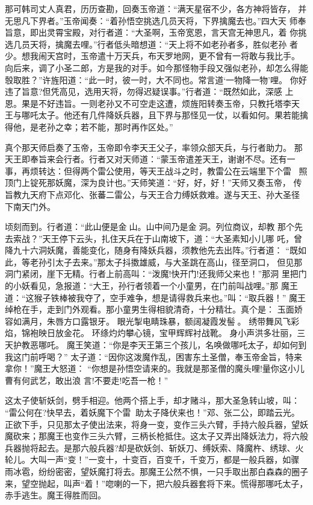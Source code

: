 那可韩司丈人真君，历历查勘，回奏玉帝道：“满天星宿不少，各方神将皆存，
并无思凡下界者。”玉帝闻奏：“着孙悟空挑选几员天将，下界擒魔去也。”四大天
师奉旨意，即出灵霄宝殿，对行者道：“大圣啊，玉帝宽恩，言天宫无神思凡，着
你挑选几员天将，擒魔去哩。”行者低头暗想道：“天上将不如老孙者多，胜似老孙
者少。想我闹天宫时，玉帝遣十万天兵，布天罗地网，更不曾有一将敢与我比手。
向后来，调了小圣二郎，方是我的对手。如今那怪物手段又强似老孙，却怎么得能
彀取胜？”许旌阳道：“此一时，彼一时，大不同也。常言道‘一物降一物’哩。
你好违了旨意?但凭高见，选用天将，勿得迟疑误事。”行者道：“既然如此，深感
上恩。果是不好违旨。一则老孙又不可空走这遭，烦旌阳转奏玉帝，只教托塔李天
王与哪吒太子。他还有几件降妖兵器，且下界与那怪见一仗，以看如何。果若能擒
得他，是老孙之幸；若不能，那时再作区处。”

真个那天师启奏了玉帝，玉帝即令李天王父子，率领众部天兵，与行者助力。
那天王即奉旨来会行者。行者又对天师道：“蒙玉帝遣差天王，谢谢不尽。还有一
事，再烦转达：但得两个雷公使用，等天王战斗之时，教雷公在云端里下个雷，
照顶门上锭死那妖魔，深为良计也。”天师笑道：“好，好，好！”天师又奏玉帝，
传旨教九天府下点邓化、张蕃二雷公，与天王合力缚妖救难。遂与天王、孙大圣径
下南天门外。

顷刻而到。行者道：“此山便是金山。山中间乃是金洞。列位商议，却教
那个先去索战？”天王停下云头，扎住天兵在于山南坡下，道：“大圣素知小儿哪
吒，曾降九十六洞妖魔，善能变化，随身有降妖兵器，须教他先去出阵。”行者道：
“既如此，等老孙引太子去来。”那太子抖擞雄威，与大圣跳在高山，径至洞口，
但见那洞门紧闭，崖下无精。行者上前高叫：“泼魔!快开门!还我师父来也！”那洞
里把门的小妖看见，急报道：“大王，孙行者领着一个小童男，在门前叫战哩。”那
魔王道：“这猴子铁棒被我夺了，空手难争，想是请得救兵来也。”叫：“取兵器！”
魔王绰枪在手，走到门外观看。那小童男生得相貌清奇，十分精壮。真个是：
玉面娇容如满月，朱唇方口露银牙。
眼光掣电睛珠暴，额阔凝霞发髻。
绣带舞风飞彩焰，锦袍映日放金花。
环绦灼灼攀心镜，宝甲辉辉衬战靴。
身小声洪多壮丽，三天护教恶哪吒。
魔王笑道：“你是李天王第三个孩儿，名唤做哪吒太子，却如何到我这门前呼喝？”
太子道：“因你这泼魔作乱，困害东土圣僧，奉玉帝金旨，特来拿你！”魔王大怒道：
“你想是孙悟空请来的。我就是那圣僧的魔头哩!量你这小儿曹有何武艺，敢出浪
言!不要走!吃吾一枪！”

这太子使斩妖剑，劈手相迎。他两个搭上手，却才赌斗，那大圣急转山坡，叫：
“雷公何在?快早去，着妖魔下个雷，助太子降伏来也！”邓、张二公，即踏云光。
正欲下手，只见那太子使出法来，将身一变，变作三头六臂，手持六般兵器，望妖
魔砍来；那魔王也变作三头六臂，三柄长枪抵住。这太子又弄出降妖法力，将六般
兵器抛将起去。是那六般兵器?却是砍妖剑、斩妖刀、缚妖索、降魔杵、绣球、火
轮儿。大叫一声“变！”一变十，十变百，百变千，千变万，都是一般兵器，如骤
雨冰雹，纷纷密密，望妖魔打将去。那魔王公然不惧，一只手取出那白森森的圈子
来，望空抛起，叫声“着！”唿喇的一下，把六般兵器套将下来。慌得那哪吒太子，
赤手逃生。魔王得胜而回。

